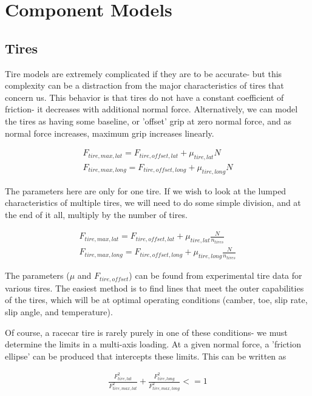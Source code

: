 \documentclass{article}
\begin{document}
\section{Component Models}

\subsection{Tires}

Tire models are extremely complicated if they are to be accurate- but this complexity can be a distraction from the major characteristics of tires that concern us. This behavior is that tires do not have a constant coefficient of friction- it decreases with additional normal force. Alternatively, we can model the tires as having some baseline, or 'offset' grip at zero normal force, and as normal force increases, maximum grip increases linearly.

\begin{align}
	F_{tire,max,lat} = F_{tire,offset,lat} + \mu_{tire,lat} N \\
	F_{tire,max,long} = F_{tire,offset,long} + \mu_{tire,long} N
\end{align}

The parameters here are only for one tire. If we wish to look at the lumped characteristics of multiple tires, we will need to do some simple division, and at the end of it all, multiply by the number of tires.

\begin{align}
	F_{tire,max,lat} = F_{tire,offset,lat} + \mu_{tire,lat} \frac{N}{n_{tires}} \\
	F_{tire,max,long} = F_{tire,offset,long} + \mu_{tire,long} \frac{N}{n_{tires}}
\end{align}

The parameters ($\mu$ and $F_{tire,offset}$) can be found from experimental tire data for various tires. The easiest method is to find lines that meet the outer capabilities of the tires, which will be at optimal operating conditions (camber, toe, slip rate, slip angle, and temperature).

Of course, a racecar tire is rarely purely in one of these conditions- we must determine the limits in a multi-axis loading. At a given normal force, a 'friction ellipse' can be produced that intercepts these limits. This can be written as

\begin{align}
	\frac{F_{tire,lat}^2}{F_{tire,max,lat}^2} + \frac{F_{tire,long}^2}{F_{tire,max,long}^2} <= 1
\end{align}
\end{document}
